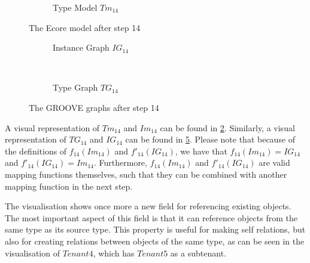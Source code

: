 \begin{figure}[p]
\begin{subfigure}{0.98\textwidth}
        \caption{Type Model $Tm_{14}$}
        \label{fig:application:building_the_model:tenant_subtenant_relationship:ecore:type_model}
    \end{subfigure}
    \caption{The Ecore model after step 14}
    \label{fig:application:building_the_model:tenant_subtenant_relationship:ecore}
\end{figure}

\begin{figure}[p]
    \centering
    \begin{subfigure}{0.98\textwidth}
        \centering
        
        \caption{Instance Graph $IG_{14}$}
        \label{fig:application:building_the_model:tenant_subtenant_relationship:groove:instance_graph}
    \end{subfigure}
    \\
    \begin{subfigure}{0.98\textwidth}
        \centering
        
        \caption{Type Graph $TG_{14}$}
        \label{fig:application:building_the_model:tenant_subtenant_relationship:groove:type_graph}
    \end{subfigure}
    \caption{The GROOVE graphs after step 14}
    \label{fig:application:building_the_model:tenant_subtenant_relationship:groove}
\end{figure}

A visual representation of $Tm_{14}$ and $Im_{14}$ can be found in \cref{fig:application:building_the_model:tenant_subtenant_relationship:ecore}. Similarly, a visual representation of $TG_{14}$ and $IG_{14}$ can be found in \cref{fig:application:building_the_model:tenant_subtenant_relationship:groove}. Please note that because of the definitions of $f_{14}(Im_{14})$ and $f'_{14}(IG_{14})$, we have that $f_{14}(Im_{14}) = IG_{14}$ and $f'_{14}(IG_{14}) = Im_{14}$. Furthermore, $f_{14}(Im_{14})$ and $f'_{14}(IG_{14})$ are valid mapping functions themselves, such that they can be combined with another mapping function in the next step.

The visualisation shows once more a new field for referencing existing objects. The most important aspect of this field is that it can reference objects from the same type as its source type. This property is useful for making self relations, but also for creating relations between objects of the same type, as can be seen in the visualisation of $Tenant4$, which has $Tenant5$ as a subtenant.

\afterpage{\FloatBarrier}